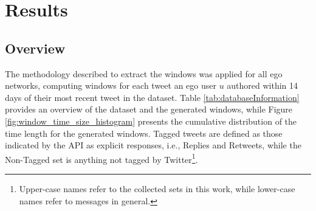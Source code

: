 
%


\section{Results}

\subsection{Overview}

The methodology described to extract the windows was applied for all \totalUsers{} ego networks, computing windows for each tweet an ego user $u$ authored within 14 days of their most recent tweet in the dataset. 
Table \ref{tab:databaseInformation} provides an overview of the dataset and the generated windows, while Figure \ref{fig:window_time_size_histogram} presents the cumulative distribution of the time length for the generated windows.  
Tagged tweets are defined as those indicated by the API as explicit responses, i.e., Replies and Retweets, while the Non-Tagged set is anything not tagged by Twitter\footnote{\label{datasets}Upper-case names refer to the collected sets in this work, while lower-case names refer to messages in general.}. 

